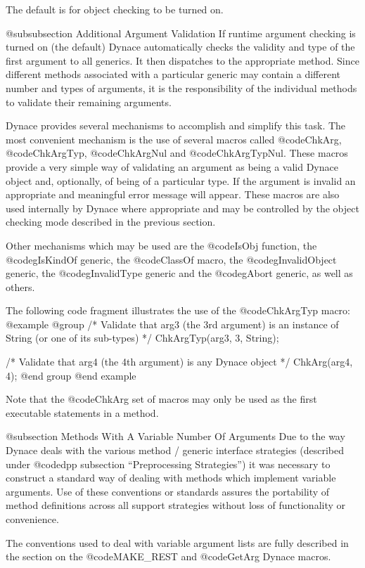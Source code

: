 The default is for object checking to be turned on.


@subsubsection Additional Argument Validation
If runtime argument checking is turned on (the default) Dynace
automatically checks the validity and type of the first argument to all
generics.  It then dispatches to the appropriate method.  Since
different methods associated with a particular generic may contain a
different number and types of arguments, it is the responsibility of the
individual methods to validate their remaining arguments.

Dynace provides several mechanisms to accomplish and simplify this task.
The most convenient mechanism is the use of several macros called
@code{ChkArg}, @code{ChkArgTyp}, @code{ChkArgNul} and
@code{ChkArgTypNul}.  These macros provide a very simple way of
validating an argument as being a valid Dynace object and, optionally,
of being of a particular type.  If the argument is invalid an
appropriate and meaningful error message will appear.  These macros are
also used internally by Dynace where appropriate and may be controlled
by the object checking mode described in the previous section.

Other mechanisms which may be used are the @code{IsObj} function, the
@code{gIsKindOf} generic, the @code{ClassOf} macro, the
@code{gInvalidObject} generic, the @code{gInvalidType} generic and the
@code{gAbort} generic, as well as others.

The following code fragment illustrates the use of the @code{ChkArgTyp}
macro:
@example
@group
/*  Validate that arg3 (the 3rd argument) is an instance of String
    (or one of its sub-types)  */
ChkArgTyp(arg3, 3, String);

/*  Validate that arg4 (the 4th argument) is any Dynace object  */
ChkArg(arg4, 4);
@end group
@end example


Note that the @code{ChkArg} set of macros may only be used as the first
executable statements in a method.

@subsection Methods With A Variable Number Of Arguments
Due to the way Dynace deals with the various method / generic interface
strategies (described under @code{dpp} subsection ``Preprocessing
Strategies'') it was necessary to construct a standard way of dealing
with methods which implement variable arguments.  Use of these
conventions or standards assures the portability of method definitions
across all support strategies without loss of functionality or
convenience.

The conventions used to deal with variable argument lists are fully
described in the section on the @code{MAKE_REST} and @code{GetArg}
Dynace macros.

